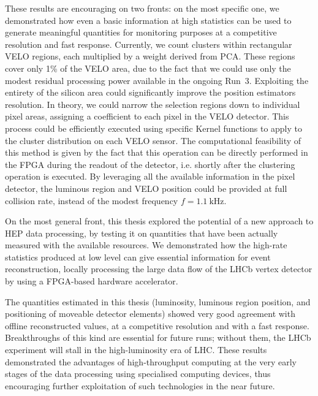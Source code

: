 These results are encouraging on two fronts: on the most specific one, we demonstrated how even a basic information at high statistics can be used to generate meaningful quantities for monitoring purposes at a competitive resolution and fast response. Currently, we count clusters within rectangular VELO regions, each multiplied by a weight derived from PCA. These regions cover only 1\% of the VELO area, due to the fact that we could use only the modest residual processing power available in the ongoing Run~3. Exploiting the entirety of the silicon area could significantly improve the position estimators resolution.  In theory, we could narrow the selection regions down to individual pixel areas, assigning a coefficient to each pixel in the VELO detector. This process could be efficiently executed using specific Kernel functions to apply to the cluster distribution on each VELO sensor. 
The computational feasibility of this method is given by the fact that this operation can be directly performed in the FPGA during the readout of the detector, i.e. shortly after the clustering operation is executed. By leveraging all the available information in the pixel detector, the luminous region and VELO position could be provided at full collision rate, instead of the modest frequency $f=\SI{1.1}{\kilo\hertz}$.


On the most general front, this thesis explored the potential of a new approach to HEP data processing, by testing it on quantities that have been actually measured with the available resources. We demonstrated how the high-rate statistics produced at low level can give essential information for event reconstruction, locally processing the large data flow of the LHCb vertex detector by using a FPGA-based hardware accelerator. 

The quantities estimated in this thesis (luminosity, luminous region position, and positioning of moveable detector elements) showed very good agreement with offline reconstructed values, at a competitive resolution and with a fast response. Breakthroughs of this kind are essential for future runs; without them, the LHCb experiment will stall in the high-luminosity era of LHC.  These results demonstrated the advantages of high-throughput computing at the very early stages of the data processing using specialised computing devices, thus encouraging further exploitation of such technologies in the near future.



